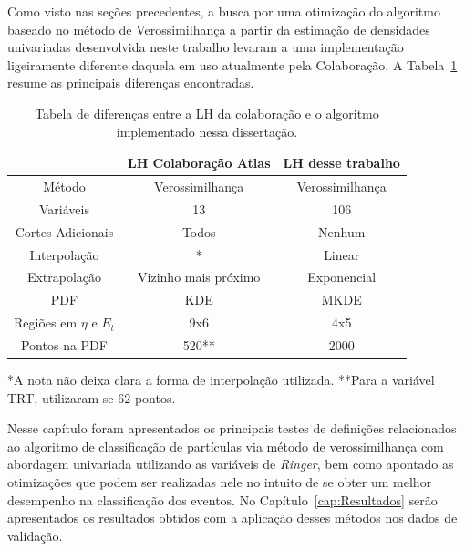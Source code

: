 Como visto nas seções precedentes, a busca por uma otimização do algoritmo baseado no método de Verossimilhança a partir da estimação de densidades univariadas desenvolvida neste trabalho levaram a uma implementação ligeiramente diferente daquela em uso atualmente pela Colaboração. A Tabela~\ref{tab:5T02} resume as principais diferenças encontradas.

\begin{table}[H]
  \centering
  \caption{Tabela de diferenças entre a \ac{LH} da colaboração \cite{atlasdescription} e o algoritmo implementado nessa dissertação.}\label{tab:5T02}
\begin{tabular}{c|c|c}
  & LH Colaboração Atlas & LH desse trabalho  \\ \hline \hline
  Método & Verossimilhança & Verossimilhança \\
  Variáveis & 13 & 106 \\
  Cortes Adicionais & Todos & Nenhum \\
  Interpolação & * & Linear \\
  Extrapolação & Vizinho mais próximo & Exponencial \\
  PDF & KDE & MKDE \\
  Regiões em $\eta$ e $E_t$ & 9x6 & 4x5 \\
  Pontos na PDF & 520** & 2000 \\
\end{tabular}

\begin{flushleft}
*A nota \cite{atlasdescription} não deixa clara a forma de interpolação utilizada.
**Para a variável TRT, utilizaram-se 62 pontos.
\end{flushleft}
\end{table}


Nesse capítulo foram apresentados os principais testes de definições relacionados ao algoritmo de classificação de partículas via método de verossimilhança com abordagem univariada utilizando as variáveis de \textit{Ringer}, bem como apontado as otimizações  que podem ser realizadas nele no intuito de se obter um melhor desempenho na classificação dos eventos. No Capítulo~\ref{cap:Resultados} serão apresentados os resultados obtidos com a aplicação desses métodos nos dados de validação.
